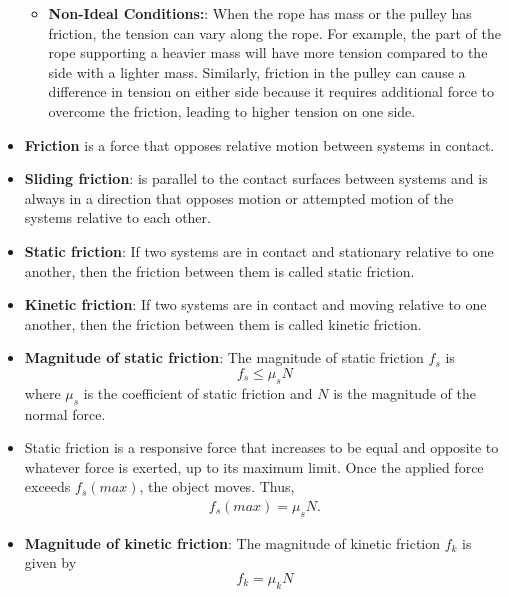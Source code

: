 \documentclass{report}
\begin{document}
\begin{itemize}
\begin{itemize}
                \item \textbf{Non-Ideal Conditions:}: When the rope has mass or the pulley has friction, the tension can vary along the rope. For example, the part of the rope supporting a heavier mass will have more tension compared to the side with a lighter mass. Similarly, friction in the pulley can cause a difference in tension on either side because it requires additional force to overcome the friction, leading to higher tension on one side.
                \end{itemize}
                \item \textbf{Friction} is a force that opposes relative motion between systems in contact.
                \item \textbf{Sliding friction}: is parallel to the contact surfaces between systems and is always in a direction that opposes motion or attempted motion of the systems relative to each other. 
                \item \textbf{Static friction}: If two systems are in contact and stationary relative to one another, then the friction between them is called static friction. 
                \item \textbf{Kinetic friction}: If two systems are in contact and moving relative to one another, then the friction between them is called kinetic friction.
                \item \textbf{Magnitude of static friction}:
                    The magnitude of static friction $f_s$ is
                    \begin{equation}
                        f_s \leq \mu_s N
                    \end{equation}
                    where $\mu_s$ is the coefficient of static friction and $N$ is the magnitude of the normal force.
                \item  Static friction is a responsive force that increases to be equal and opposite to whatever force is exerted, up to its maximum limit. Once the applied force exceeds $f_{s}(max)$, the object moves. Thus,
                    \begin{align*}
                        f_{s}(max) = \mu_{s}N
                    .\end{align*}
                \item \textbf{Magnitude of kinetic friction}:
                    The magnitude of kinetic friction $f_k$ is given by
                    \begin{equation}
                        f_k = \mu_k N

\end{equation}
\end{itemize}
\end{document}
